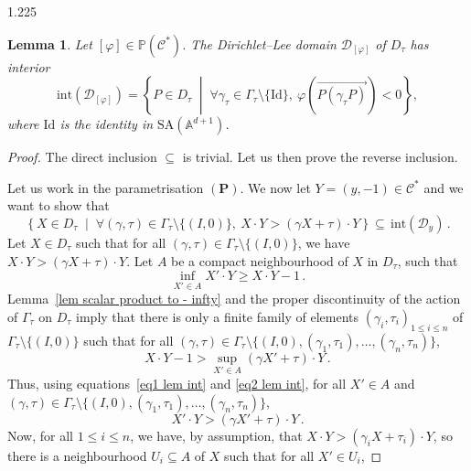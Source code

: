 \documentclass[reqno, a4paper]{amsart}
\numberwithin{equation}{section}
\numberwithin{figure}{section}
\newtheorem{lemma}[theorem]{Lemma}
\theoremstyle{definition}
\theoremstyle{remark}
\newcommand{\A}{\mathbb{A}} %
\renewcommand{\P}{\mathbb{P}} %
\newcommand{\SA}{\mathrm{SA}} %
\newcommand{\Id}{\mathrm{Id}} %
\newcommand{\C}{\mathcal{C}} %
\newcommand{\DL}{\mathcal{D}} %
\newcommand{\st}{\; \middle\vert \;} %
\newcommand{\vp}[1]{{\left( {#1} \right)}} %
\begin{document}
\begin{spacing}{1.225}
\begin{lemma}
\label{lem int of Dirichlet--Lee domain}
Let $[\varphi]\in \P(\C^*)$. The Dirichlet--Lee domain $\DL_{[\varphi]}$ of $D_\tau$ has interior
\begin{equation*}
 \mathrm{int}(\DL_{[\varphi]}) = \left\lbrace P \in D_\tau \st \forall \gamma_\tau \in \Gamma_\tau\setminus \{\Id\}, \ \varphi\vp{\overrightarrow{P(\gamma_\tau P)}} < 0\right\rbrace ,
\end{equation*}
where $\Id$ is the identity in $\SA (\A^{d+1})$. 
\end{lemma}
\begin{proof}
The direct inclusion $\subseteq$ is trivial. Let us then prove the reverse inclusion.

Let us work in the parametrisation $(\mathbf{P})$. We now let $Y=(y,-1) \in \C^*$ and we want to show that 
\begin{equation*}
\left\lbrace X \in D_\tau \st \forall (\gamma,\tau) \in \Gamma_\tau\setminus \{(I,0)\}, \ X\cdot Y > (\gamma X + \tau ) \cdot Y\right\rbrace \subseteq \, \mathrm{int}(\DL_{y}) \,.
\end{equation*}
Let $X \in D_\tau$ such that for all $(\gamma,\tau) \in \Gamma_\tau\setminus \{(I,0)\}$, we have $X\cdot Y > (\gamma X + \tau ) \cdot Y$. Let $A$ be a compact neighbourhood of $X$ in $D_\tau$, such that 
\begin{equation}
\label{eq1 lem int}
\inf_{X' \in A} X' \cdot Y \geq X \cdot Y -1 \, . 
\end{equation}
Lemma~\ref{lem scalar product to - infty} and the proper discontinuity of the action of $\Gamma_\tau$ on $D_\tau$ imply that there is only a finite family of elements $(\gamma_i,\tau_i)_{1 \leq i \leq n}$ of $\Gamma_\tau \setminus\{(I,0)\}$ such that for all $(\gamma,\tau) \in \Gamma_\tau \setminus\{(I,0),(\gamma_1,\tau_1), \dots, (\gamma_n,\tau_n)\}$,
\begin{equation}
\label{eq2 lem int}
X \cdot Y - 1 > \sup_{X' \in A} (\gamma X' + \tau) \cdot Y \, . 
\end{equation}
Thus, using equations~\eqref{eq1 lem int} and \eqref{eq2 lem int}, for all $X' \in A$ and $(\gamma,\tau) \in \Gamma_\tau \setminus\{(I,0),(\gamma_1,\tau_1), \dots, (\gamma_n,\tau_n)\}$,
\begin{equation}
\label{eq3 lem int}
 X' \cdot Y > (\gamma X' + \tau ) \cdot Y \, . 
\end{equation}
Now, for all $1 \leq i \leq n$, we have, by assumption, that $X\cdot Y > (\gamma_i X + \tau_i ) \cdot Y$, so there is a neighbourhood $U_i \subseteq A$ of $X$ such that for all $X' \in U_i$,

\end{proof}
\end{spacing}
\end{document}
